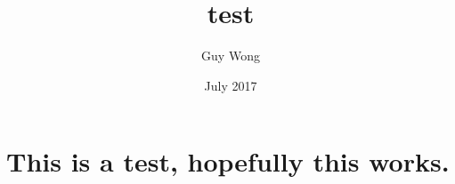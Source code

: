 \documentclass{article}
\title{test}
\author{Guy Wong}
\date{July 2017}
\begin{document}
\maketitle

\section{This is a test, hopefully this works.}
\end{document}
